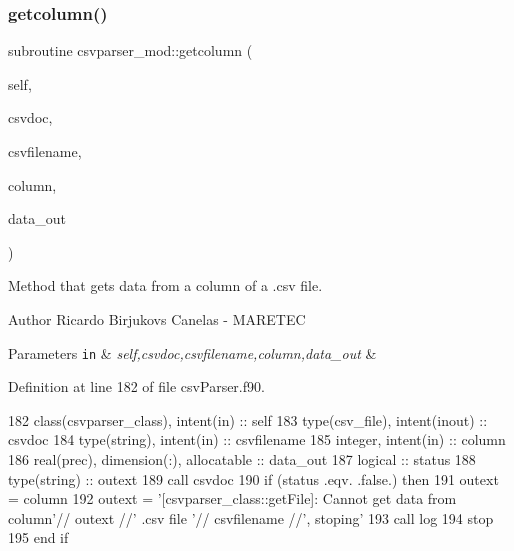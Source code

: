 \subsubsection{\texorpdfstring{getcolumn()}{getcolumn()}}
{\footnotesize\ttfamily subroutine csvparser\+\_\+mod\+::getcolumn (\begin{DoxyParamCaption}\item[{class(\mbox{\hyperlink{structcsvparser__mod_1_1csvparser__class}{csvparser\+\_\+class}}), intent(in)}]{self,  }\item[{type(csv\+\_\+file), intent(inout)}]{csvdoc,  }\item[{type(string), intent(in)}]{csvfilename,  }\item[{integer, intent(in)}]{column,  }\item[{real(prec), dimension(\+:), allocatable}]{data\+\_\+out }\end{DoxyParamCaption})\hspace{0.3cm}{\ttfamily [private]}}



Method that gets data from a column of a .csv file. 

\begin{DoxyAuthor}{Author}
Ricardo Birjukovs Canelas -\/ M\+A\+R\+E\+T\+EC 
\end{DoxyAuthor}

\begin{DoxyParams}[1]{Parameters}
\mbox{\tt in}  & {\em self,csvdoc,csvfilename,column,data\+\_\+out} & \\
\hline
\end{DoxyParams}


Definition at line 182 of file csv\+Parser.\+f90.


\begin{DoxyCode}
182     \textcolor{keywordtype}{class}(csvparser\_class), \textcolor{keywordtype}{intent(in)} :: self
183     \textcolor{keywordtype}{type}(csv\_file), \textcolor{keywordtype}{intent(inout)} :: csvdoc
184     \textcolor{keywordtype}{type}(string), \textcolor{keywordtype}{intent(in)} :: csvfilename
185     \textcolor{keywordtype}{integer}, \textcolor{keywordtype}{intent(in)} :: column
186     \textcolor{keywordtype}{real(prec)}, \textcolor{keywordtype}{dimension(:)}, \textcolor{keywordtype}{allocatable} :: data\_out
187     \textcolor{keywordtype}{logical} :: status
188     \textcolor{keywordtype}{type}(string) :: outext
189     \textcolor{keyword}{call }csvdoc%
190     \textcolor{keywordflow}{if} (status .eqv. .false.) \textcolor{keywordflow}{then}
191         outext = column
192         outext = \textcolor{stringliteral}{'[csvparser\_class::getFile]: Cannot get data from column'}// outext //\textcolor{stringliteral}{' .csv file '}// 
      csvfilename //\textcolor{stringliteral}{', stoping'}
193         \textcolor{keyword}{call }log%
194         stop
195 \textcolor{keywordflow}{    end if}
\end{DoxyCode}
\mbox{\label{namespacecsvparser__mod_aa7dbe42af8b97daccf58fc7be9939f60}} 
